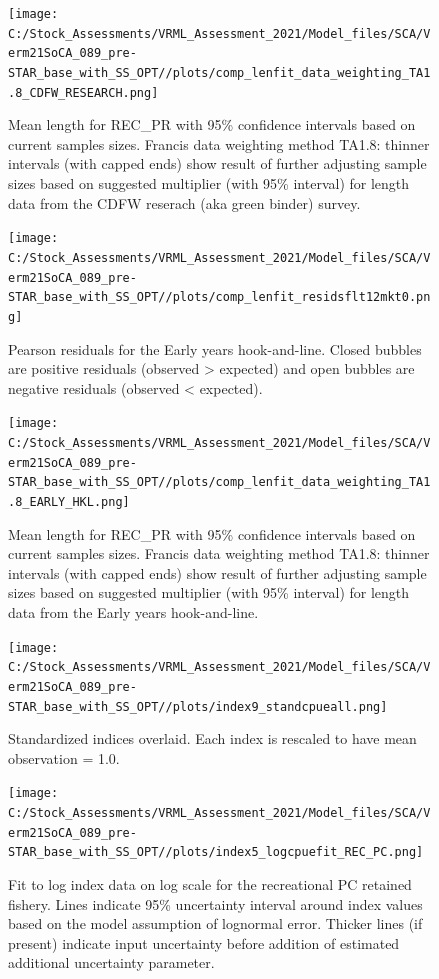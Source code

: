 \documentclass[
  english,
  a4paper,
]{article}
\begin{document}
\begin{figure}
\centering
\texttt{[image: C:/Stock\_Assessments/VRML\_Assessment\_2021/Model\_files/SCA/Verm21SoCA\_089\_pre-STAR\_base\_with\_SS\_OPT//plots/comp\_lenfit\_data\_weighting\_TA1.8\_CDFW\_RESEARCH.png]}
\caption{Mean length for REC\_PR with 95\% confidence intervals based on current samples sizes. Francis data weighting method TA1.8: thinner intervals (with capped ends) show result of further adjusting sample sizes based on suggested multiplier (with 95\% interval) for length data from the CDFW reserach (aka green binder) survey.\label{fig:mean-len-fit-CDFW_RESEARCH}}
\end{figure}

\begin{figure}
\centering
\texttt{[image: C:/Stock\_Assessments/VRML\_Assessment\_2021/Model\_files/SCA/Verm21SoCA\_089\_pre-STAR\_base\_with\_SS\_OPT//plots/comp\_lenfit\_residsflt12mkt0.png]}
\caption{Pearson residuals for the Early years hook-and-line. Closed bubbles are positive residuals (observed \textgreater{} expected) and open bubbles are negative residuals (observed \textless{} expected).\label{fig:len-pearson-EARLY_HKL}}
\end{figure}

\begin{figure}
\centering
\texttt{[image: C:/Stock\_Assessments/VRML\_Assessment\_2021/Model\_files/SCA/Verm21SoCA\_089\_pre-STAR\_base\_with\_SS\_OPT//plots/comp\_lenfit\_data\_weighting\_TA1.8\_EARLY\_HKL.png]}
\caption{Mean length for REC\_PR with 95\% confidence intervals based on current samples sizes. Francis data weighting method TA1.8: thinner intervals (with capped ends) show result of further adjusting sample sizes based on suggested multiplier (with 95\% interval) for length data from the Early years hook-and-line.\label{fig:mean-len-fit-EARLY_HKL}}
\end{figure}

\FloatBarrier

\FloatBarrier

\begin{figure}
\centering
\texttt{[image: C:/Stock\_Assessments/VRML\_Assessment\_2021/Model\_files/SCA/Verm21SoCA\_089\_pre-STAR\_base\_with\_SS\_OPT//plots/index9\_standcpueall.png]}
\caption{Standardized indices overlaid. Each index is rescaled to have mean observation = 1.0.\label{fig:cpueall}}
\end{figure}

\begin{figure}
\centering
\texttt{[image: C:/Stock\_Assessments/VRML\_Assessment\_2021/Model\_files/SCA/Verm21SoCA\_089\_pre-STAR\_base\_with\_SS\_OPT//plots/index5\_logcpuefit\_REC\_PC.png]}
\caption{Fit to log index data on log scale for the recreational PC retained fishery. Lines indicate 95\% uncertainty interval around index values based on the model assumption of lognormal error. Thicker lines (if present) indicate input uncertainty before addition of estimated additional uncertainty parameter.\label{fig:log-cpue-REC-PC}}
\end{figure}
\end{document}
